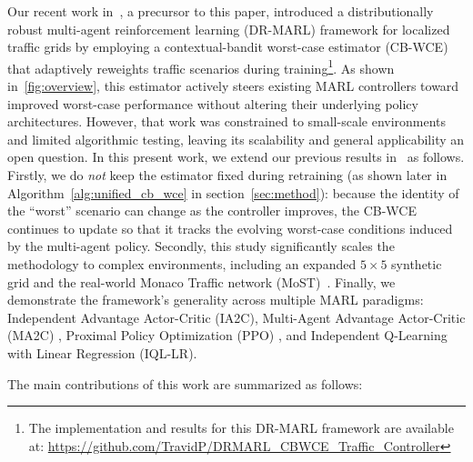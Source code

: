\documentclass[lettersize,journal]{IEEEtran}
\begin{document}
Our recent work in~\cite{pei2025distributionally}, a precursor to this paper, introduced a distributionally robust multi-agent reinforcement learning (DR-MARL) framework for localized traffic grids by employing a contextual-bandit worst-case estimator (CB-WCE)~\cite{liu2025distributionallyrobustmultiagentreinforcement} that adaptively reweights traffic scenarios during training\footnote{The implementation and results for this DR-MARL framework are available at: \url{https://github.com/TravidP/DRMARL_CBWCE_Traffic_Controller}}. As shown in~\cref{fig:overview}, this estimator actively steers existing MARL controllers toward improved worst-case performance without altering their underlying policy architectures. However, that work was constrained to small-scale environments and limited algorithmic testing, leaving its scalability and general applicability an open question. In this present work, we extend our previous results in~\cite{pei2025distributionally} as follows.  Firstly, we do \emph{not} keep the estimator fixed during retraining (as shown later in Algorithm~\ref{alg:unified_cb_wce} in section~\ref{sec:method}): because the identity of the ``worst'' scenario can change as the controller improves, the CB-WCE continues to update so that it tracks the evolving worst-case conditions induced by the multi-agent policy. Secondly, this study significantly scales the methodology to complex environments, including an expanded $5\times5$ synthetic grid and the real-world Monaco Traffic network (MoST)~\cite{codeca2018monaco}. Finally, we demonstrate the framework's generality across multiple MARL paradigms: Independent Advantage Actor-Critic (IA2C)\cite{chu2019multi}, Multi-Agent Advantage Actor-Critic (MA2C) \cite{chu2019multi}, Proximal Policy Optimization (PPO) \cite{schulman2017proximal}, and Independent Q-Learning with Linear Regression (IQL-LR)\cite{tan1993multi}.

The main contributions of this work are summarized as follows:
\end{document}
